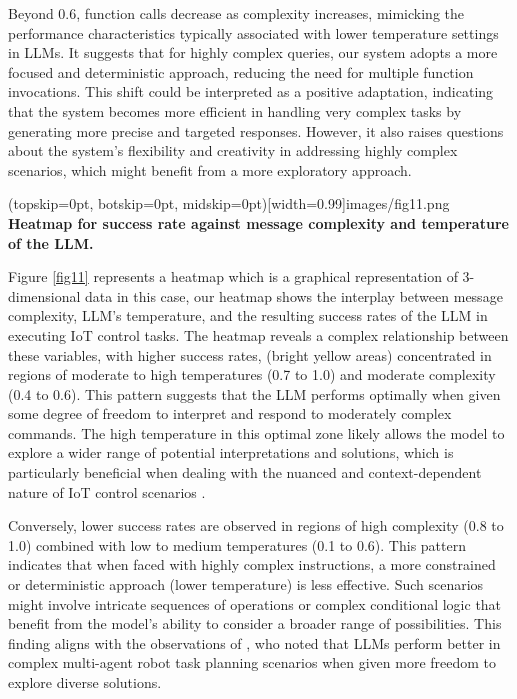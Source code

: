 \documentclass{ieeeaccess}
\begin{document}
Beyond 0.6, function calls decrease as complexity increases, mimicking the performance characteristics typically associated with lower temperature settings in LLMs. It suggests that for highly complex queries, our system adopts a more focused and deterministic approach, reducing the need for multiple function invocations. This shift could be interpreted as a positive adaptation, indicating that the system becomes more efficient in handling very complex tasks by generating more precise and targeted responses. However, it also raises questions about the system's flexibility and creativity in addressing highly complex scenarios, which might benefit from a more exploratory approach.

\Figure[t!](topskip=0pt, botskip=0pt,
midskip=0pt)[width=0.99\columnwidth]{{images/fig11.png}}
{ \textbf{Heatmap for success rate against message complexity and temperature of the LLM.}\label{fig11}}

Figure \ref{fig11} represents a heatmap which is a graphical representation of 3-dimensional data in this case, our heatmap shows the interplay between message complexity, LLM's temperature, and the resulting success rates of the LLM in executing IoT control tasks. The heatmap reveals a complex relationship between these variables, with higher success rates, (bright yellow areas) concentrated in regions of moderate to high temperatures (0.7 to 1.0) and moderate complexity (0.4 to 0.6). This pattern suggests that the LLM performs optimally when given some degree of freedom to interpret and respond to moderately complex commands. The high temperature in this optimal zone likely allows the model to explore a wider range of potential interpretations and solutions, which is particularly beneficial when dealing with the nuanced and context-dependent nature of IoT control scenarios \cite{10315791}. 

Conversely, lower success rates are observed in regions of high complexity (0.8 to 1.0) combined with low to medium temperatures (0.1 to 0.6). This pattern indicates that when faced with highly complex instructions, a more constrained or deterministic approach (lower temperature) is less effective. Such scenarios might involve intricate sequences of operations or complex conditional logic that benefit from the model's ability to consider a broader range of possibilities. This finding aligns with the observations of \citet{kannan2024smartllmsmartmultiagentrobot}, who noted that LLMs perform better in complex multi-agent robot task planning scenarios when given more freedom to explore diverse solutions. 
\end{document}
